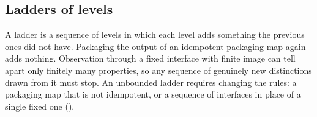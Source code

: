 \subsection*{Ladders of levels}

\begin{theorem}\label{thm:NG_LADDER_IDEM}
\ThmStmtNGLADDERIDEM
\end{theorem}

\begin{theorem}\label{thm:NG_LADDER_BOUNDED_INTERFACE}
\ThmStmtNGLADDERBOUNDEDINTERFACE
\end{theorem}

A ladder is a sequence of levels in which each level adds something the previous ones did not have.
Packaging the output of an idempotent packaging map again adds nothing.
Observation through a fixed interface with finite image can tell apart only finitely many properties, so any sequence of genuinely new distinctions drawn from it must stop.
An unbounded ladder requires changing the rules: a packaging map that is not idempotent, or a sequence of interfaces in place of a single fixed one ().

